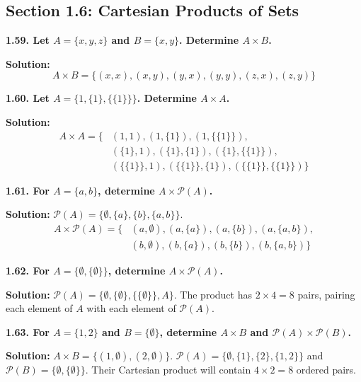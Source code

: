 \documentclass[12pt]{article}
\begin{document}
\subsection{Section 1.6: Cartesian Products of Sets}

\textbf{1.59. Let $A = \{x, y, z\}$ and $B = \{x, y\}$. Determine $A \times B$.}

\textbf{Solution:}
\[ A \times B = \{(x,x), (x,y), (y,x), (y,y), (z,x), (z,y)\} \]

\hrulefill

\textbf{1.60. Let $A = \{1, \{1\}, \{\{1\}\}\}$. Determine $A \times A$.}

\textbf{Solution:}
\begin{align*}
A \times A = \{ &(1, 1), (1, \{1\}), (1, \{\{1\}\}), \\
&(\{1\}, 1), (\{1\}, \{1\}), (\{1\}, \{\{1\}\}), \\
&(\{\{1\}\}, 1), (\{\{1\}\}, \{1\}), (\{\{1\}\}, \{\{1\}\}) \}
\end{align*}

\hrulefill

\textbf{1.61. For $A = \{a, b\}$, determine $A \times \mathcal{P}(A)$.}

\textbf{Solution:}
$\mathcal{P}(A) = \{\emptyset, \{a\}, \{b\}, \{a, b\}\}$.
\begin{align*}
A \times \mathcal{P}(A) = \{ &(a, \emptyset), (a, \{a\}), (a, \{b\}), (a, \{a, b\}), \\
&(b, \emptyset), (b, \{a\}), (b, \{b\}), (b, \{a, b\}) \}
\end{align*}

\hrulefill

\textbf{1.62. For $A = \{\emptyset, \{\emptyset\}\}$, determine $A \times \mathcal{P}(A)$.}

\textbf{Solution:}
$\mathcal{P}(A) = \{\emptyset, \{\emptyset\}, \{\{\emptyset\}\}, A\}$.
The product has $2 \times 4 = 8$ pairs, pairing each element of $A$ with each element of $\mathcal{P}(A)$.

\hrulefill

\textbf{1.63. For $A = \{1, 2\}$ and $B = \{\emptyset\}$, determine $A \times B$ and $\mathcal{P}(A) \times \mathcal{P}(B)$.}

\textbf{Solution:}
$A \times B = \{(1, \emptyset), (2, \emptyset)\}$.
$\mathcal{P}(A) = \{\emptyset, \{1\}, \{2\}, \{1, 2\}\}$ and $\mathcal{P}(B) = \{\emptyset, \{\emptyset\}\}$.
Their Cartesian product will contain $4 \times 2 = 8$ ordered pairs.

\hrulefill
\end{document}
